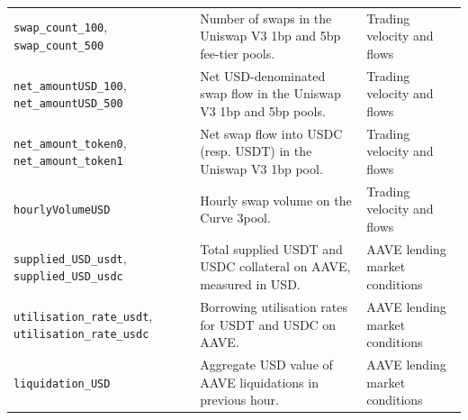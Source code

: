 \documentclass[a4paper,fleqn]{cas-sc}
\begin{document}
\begin{longtable}{p{} p{} p{}}
\midrule

\texttt{swap\_count\_100}, \texttt{swap\_count\_500} 
& Number of swaps in the Uniswap V3 1bp and 5bp fee-tier pools. 
& Trading velocity and flows \\

\texttt{net\_amountUSD\_100}, \texttt{net\_amountUSD\_500} 
& Net USD-denominated swap flow in the Uniswap V3 1bp and 5bp pools. 
& Trading velocity and flows \\

\texttt{net\_amount\_token0}, \texttt{net\_amount\_token1} 
& Net swap flow into USDC (resp. USDT) in the Uniswap V3 1bp pool. 
& Trading velocity and flows \\

\texttt{hourlyVolumeUSD} 
& Hourly swap volume on the Curve 3pool. 
& Trading velocity and flows \\

\midrule

\texttt{supplied\_USD\_usdt}, \texttt{supplied\_USD\_usdc} 
& Total supplied USDT and USDC collateral on AAVE, measured in USD. 
& AAVE lending market conditions \\

\texttt{utilisation\_rate\_usdt}, \texttt{utilisation\_rate\_usdc} 
& Borrowing utilisation rates for USDT and USDC on AAVE. 
& AAVE lending market conditions \\

\texttt{liquidation\_USD} 
& Aggregate USD value of AAVE liquidations in previous hour. 
& AAVE lending market conditions \\

\end{longtable}
\end{document}
